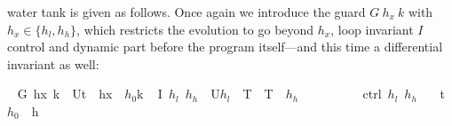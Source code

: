 \documentclass[envcountsame,envcountsect]{llncs}
\begin{document}
\begin{example}
water tank is given as follows. Once again we introduce the guard $G\
h_x\ k$ with $h_x\in\{h_l,h_h\}$, which restricts the evolution to 
go beyond $h_x$,
loop invariant $I$ control and dynamic part before the program
itself---and this time a differential invariant  as well:
\begin{isabellebody}
\isanewline
{}\ %
{\isachardoublequoteopen}G\ h\isactrlsub x\ k\ {\isasymequiv}\ U{\isacharparenleft}t\ {\isasymle}\ {\isacharparenleft}h\isactrlsub x\ {\isacharminus}\ $h_0${\isacharparenright}{\isacharslash}k{\isacharparenright}{\isachardoublequoteclose}\isanewline
\isanewline
{}\ %
{\isachardoublequoteopen}I\ $h_l$\ $h_h$\ {\isasymequiv}\ U{\isacharparenleft}$h_l$\ {\isasymle}\ T\ {\isasymand}\ T\ {\isasymle}\ $h_h$\ {\isasymand}\ {\isacharparenleft}{\isasympi}\ {\isacharequal}\ {}\ {\isasymor}\ {\isasympi}\ {\isacharequal}\ {}{\isacharparenright}{\isacharparenright}{\isachardoublequoteclose}\isanewline
\isanewline
{}\ %
{\isachardoublequoteopen}ctrl\ $h_l$\ $h_h$\ {\isasymequiv}\isanewline
\ \ {\isacharparenleft}t\ {\isacharcolon}{\isacharcolon}{\isacharequal}{}{\isacharparenright}{\isacharsemicolon}{\isacharparenleft}$h_0$\ {\isacharcolon}{\isacharcolon}{\isacharequal}\ h{\isacharparenright}{\isacharsemicolon}\isanewline

\end{isabellebody}
\end{example}
\end{document}

